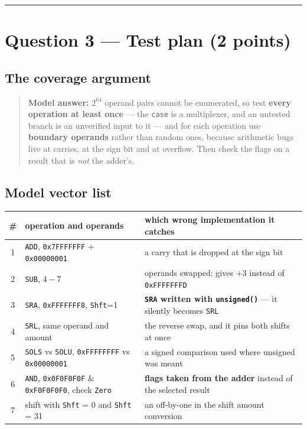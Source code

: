 \documentclass[11pt]{article}
\newcommand{\code}[1]{\texttt{#1}}
\newcommand{\hr}{\vspace{2pt}\hrule\vspace{6pt}}
\begin{document}
\vspace{4pt}\hr

\section*{Question 3 --- Test plan (2 points)}

\subsection*{The coverage argument}

\begin{quote}
\textbf{Model answer:} $2^{64}$ operand pairs cannot be enumerated, so test
\textbf{every operation at least once} --- the \code{case} is a multiplexer, and
an untested branch is an unverified input to it --- and for each operation use
\textbf{boundary operands} rather than random ones, because arithmetic bugs live
at carries, at the sign bit and at overflow. Then check the flags on a result
that is \emph{not} the adder's.
\end{quote}

\subsection*{Model vector list}

\begin{center}
\small
\begin{tabular}{c>{\raggedright\arraybackslash}p{5.0cm}>{\raggedright\arraybackslash}p{7.6cm}}
\toprule
\# & operation and operands & which wrong implementation it catches \\
\midrule
1 & \code{ADD}, \code{0x7FFFFFFF} + \code{0x00000001} & a carry that is dropped at the sign bit \\
2 & \code{SUB}, $4 - 7$ & operands swapped: gives $+3$ instead of \code{0xFFFFFFFD} \\
3 & \code{SRA}, \code{0xFFFFFFF8}, \code{Shft}=1 & \textbf{\code{SRA} written with \code{unsigned()}} --- it silently becomes \code{SRL} \\
4 & \code{SRL}, same operand and amount & the reverse swap, and it pins both shifts at once \\
5 & \code{SOLS} vs \code{SOLU}, \code{0xFFFFFFFF} vs \code{0x00000001} & a signed comparison used where unsigned was meant \\
6 & \code{AND}, \code{0x0F0F0F0F} \& \code{0xF0F0F0F0}, check \code{Zero} & \textbf{flags taken from the adder} instead of the selected result \\
7 & shift with \code{Shft} = 0 and \code{Shft} = 31 & an off-by-one in the shift amount conversion \\
\bottomrule
\end{tabular}
\end{center}
\end{document}
